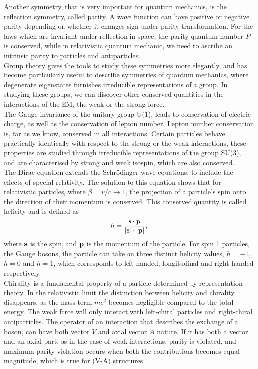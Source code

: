 \documentclass[12pt,a4paper]{article}
\numberwithin{equation}{section}
\begin{document}
Another symmetry, that is very important for quantum mechanics, is the
reflection symmetry, called parity. A wave function can have positive or
negative parity depending on whether it changes sign under parity
transformation. For the laws which are invariant under reflection in space, the
parity quantum number $P$ is conserved, while in relativistic quantum mechanic,
we need to ascribe an intrinsic parity to particles and antiparticles.\\

Group theory gives the tools to study these symmetries more elegantly, and has
become particularly useful to describe symmetries of quantum mechanics, where
degenerate eigenstates furnishes irreducible representations of a group. In
studying these groups, we can discover other conserved quantities in the
interactions of the EM, the weak or the strong force.\\

The Gauge invariance of the unitary group U(1), leads to conservation of
electric charge, as well as the conservation of lepton number. Lepton number
conservation is, far as we know, conserved in all interactions. Certain
particles behave practically identically with respect to the strong or the weak
interactions, these properties are studied through irreducible representations
of the group SU(3), and are characterised by strong and weak isospin, which are
also conserved.\\

The Dirac equation extends the Schrödinger wave equations, to include the
effects of special relativity. The solution to this equation shows that for
relativistic particles, where $\beta = v/c \rightarrow 1$, the projection of a particle's spin
onto the direction of their momentum is conserved. This conserved quantity is
called helicity\cite[63]{Povh2015} and is defined as
\begin{equation}
  h = \frac{\vb{s \cdot p}}{\abs{\vb s} \cdot \abs{\vb p}},
\end{equation}
where $\vb s$ is the spin, and $\vb p$ is the momentum of the particle. For
spin 1 particles, the Gauge bosons, the particle can take on three distinct
helicity values, $h=-1$, $h=0$ and $h=1$, which corresponds to left-handed,
longitudinal and right-handed respectively.\\

Chirality is a fundamental property of a particle determined by representation
theory. In the relativistic limit the distinction between helicity and chirality
disappears, as the mass term $mc^2$ becomes negligible compared to the total
energy. The weak force will only interact with left-chiral particles and
right-chiral antiparticles. The operator of an interaction that describes the
exchange of a boson, can have both vector $V$ and axial vector $A$ nature. If it
has both a vector and an axial part, as in the case of weak interactions, parity
is violated, and maximum parity violation occurs when both the contributions
becomes equal magnitude, which is true for (V-A) structures.\\
\end{document}
